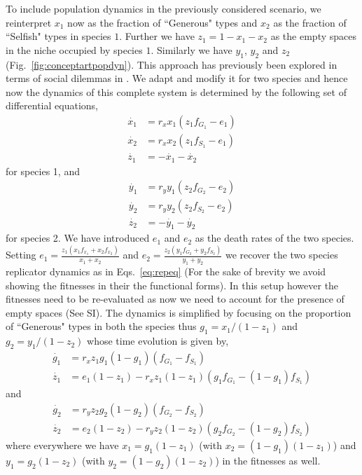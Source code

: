 \documentclass[12pt]{article}
\begin{document}
To include population dynamics in the previously considered scenario, we reinterpret $x_1$ now as the fraction of ``Generous" types and $x_2
$ as the fraction of ``Selfish" types in species $1$.
Further we have $z_1 = 1 - x_1 - x_2$ as the empty spaces in the niche occupied by species $1$. 
Similarly we have $y_1$, $y_2$ and $z_2$ (Fig.~\ref{fig:conceptartpopdyn}).
This approach has previously been explored in terms of social dilemmas in \citep{hauert:PRSB:2006}.
We adapt and modify it for two species and hence now the dynamics of this complete system is determined by the following set of differential equations,
%
\begin{align}
	\dot{x_1} &= r_x x_1 (z_1 f_{G_1} - e_1) \nonumber \\
	\dot{x_2} &= r_x x_2 (z_1 f_{S_1} - e_1) \\
	\dot{z_1} &= - \dot{x_1} - \dot{x_2} \nonumber
\end{align}
%
for species 1, and
%
\begin{align}
	\dot{y_1} &= r_y y_1 (z_2 f_{G_2} - e_2) \nonumber \\
	\dot{y_2} &= r_y y_2 (z_2 f_{S_2} - e_2) \\
	\dot{z_2} &= - \dot{y_1} - \dot{y_2} \nonumber
\end{align}
%
for species 2. 
We have introduced $e_1$ and $e_2$ as the death rates of the two species.
Setting $e_1 = \frac{z_1 (x_1 f_{x_1} + x_2 f_{x_2}) }{x_1 + x_2}$ and $e_2 = \frac{z_2 (y_1 f_{G_2} + y_2 f_{S_2}) }{y_1 + y_2}$ we recover the two species replicator dynamics as in Eqs.~\ref{eq:repeq} (For the sake of brevity we avoid showing the fitnesses in their the functional forms).
In this setup however the fitnesses need to be re-evaluated as now we need to account for the presence of empty spaces (See SI).
The dynamics is simplified by focusing on the proportion of ``Generous" types in both the species thus $g_1 = x_1/(1-z_1)$ and $g_2 = y_1/(1-z_2)$ whose time evolution is given by,
\begin{align}
	\dot{g_1} &= r_x z_1 g_1 (1-g_1) (f_{G_1} - f_{S_1}) \nonumber \\
	\dot{z_1} &= e_1 (1-z_1) - r_x z_1 (1-z_1) (g_1 f_{G_1} -  (1-g_1) f_{S_1})
\end{align}
and
\begin{align}
	\dot{g_2} &= r_y z_2 g_2 (1-g_2) (f_{G_2} - f_{S_2}) \nonumber \\
	\dot{z_2} &= e_2 (1-z_2) - r_y z_2 (1-z_2) (g_2 f_{G_2} -  (1-g_2) f_{S_2})
\end{align}
%
where everywhere we have $x_1 = g_1 (1-z_1)$ (with $x_2 = (1-g_1) (1-z_1)$) and $y_1 = g_2 (1-z_2)$ (with $y_2 = (1-g_2) (1-z_2)$) in the fitnesses as well.
\end{document}
